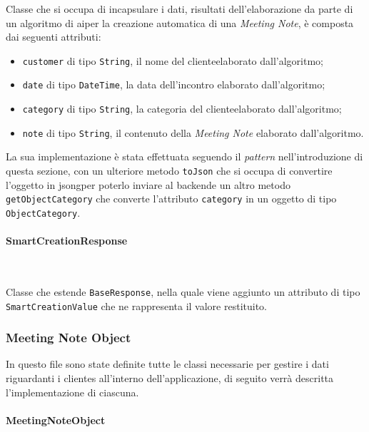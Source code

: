 \noindent Classe che si occupa di incapsulare i dati, risultati dell'elaborazione da parte di un algoritmo di \gls{ai}\glsoccur per la creazione automatica di una \emph{Meeting Note}, è composta dai seguenti attributi:
\begin{itemize}
    \item \lstinline{customer} di tipo \lstinline{String}, il nome del \gls{cliente}\glsoccur elaborato dall'algoritmo;
    \item \lstinline{date} di tipo \lstinline{DateTime}, la data dell'incontro elaborato dall'algoritmo;
    \item \lstinline{category} di tipo \lstinline{String}, la categoria del \gls{cliente}\glsoccur elaborato dall'algoritmo;
    \item \lstinline{note} di tipo \lstinline{String}, il contenuto della \emph{Meeting Note} elaborato dall'algoritmo.
\end{itemize}
La sua implementazione è stata effettuata seguendo il \emph{pattern} nell'introduzione di questa sezione, con un ulteriore metodo \lstinline{toJson} che si occupa di convertire l'oggetto in \gls{jsong}\glsoccur per poterlo inviare al \gls{backend}\glsoccur e un altro metodo \lstinline{getObjectCategory} che converte l'attributo \lstinline{category} in un oggetto di tipo \lstinline{ObjectCategory}.

\paragraph*{SmartCreationResponse} ~ \\
\label{par:smart-creation-response}

\noindent Classe che estende \lstinline{BaseResponse}, nella quale viene aggiunto un attributo di tipo \lstinline{SmartCreationValue} che ne rappresenta il valore restituito.

\subsubsection*{Meeting Note Object}
\label{subsubsec:meeting-note-object}

In questo file sono state definite tutte le classi necessarie per gestire i dati riguardanti i \glspl{cliente} all'interno dell'applicazione, di seguito verrà descritta l'implementazione di ciascuna.

\paragraph*{MeetingNoteObject} ~ \\
\label{par:meeting-note-object}

